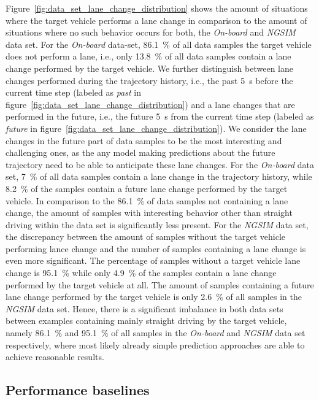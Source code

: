 Figure~\ref{fig:data_set_lane_change_distribution} shows the amount of situations where the target vehicle performs a lane change in comparison to the amount of situations where no such behavior occurs for both, the \emph{On-board} and \emph{\ac{NGSIM}} data set.
For the \emph{On-board} data-set, \SI{86.1}{\percent} of all data samples the target vehicle does not perform a lane, i.e., only \SI{13.8}{\percent} of all data samples contain a lane change performed by the target vehicle.
We further distinguish between lane changes performed during the trajectory history, i.e., the past \SI{5}{\second} before the current time step (labeled as \emph{past} in figure~\ref{fig:data_set_lane_change_distribution}) and a lane changes that are performed in the future, i.e., the future \SI{5}{\second} from the current time step (labeled as \emph{future} in figure~\ref{fig:data_set_lane_change_distribution}).
We consider the lane changes in the future part of data samples to be the most interesting and challenging ones, as the any model making predictions about the future trajectory need to be able to anticipate these lane changes.
For the \emph{On-board} data set, \SI{7}{\percent} of all data samples contain a lane change in the trajectory history, while \SI{8.2}{\percent} of the samples contain a future lane change performed by the target vehicle.
In comparison to the \SI{86.1}{\percent} of data samples not containing a lane change, the amount of samples with interesting behavior other than straight driving within the data set is significantly less present.
For the \emph{\ac{NGSIM}} data set, the discrepancy between the amount of samples without the target vehicle performing lance change and the number of samples containing a lane change is even more significant.
The percentage of samples without a target vehicle lane change is \SI{95.1}{\percent} while only \SI{4.9}{\percent} of the samples contain a lane change performed by the target vehicle at all.
The amount of samples containing a future lane change performed by the target vehicle is only \SI{2.6}{\percent} of all samples in the \emph{\ac{NGSIM}} data set.
Hence, there is a significant imbalance in both data sets between examples containing mainly straight driving by the target vehicle, namely \SI{86.1}{\percent} and \SI{95.1}{\percent} of all samples in the \emph{On-board} and \emph{\ac{NGSIM}} data set respectively, where most likely already simple prediction approaches are able to achieve reasonable results.

\subsection{Performance baselines}
\label{subsec:baselines}

